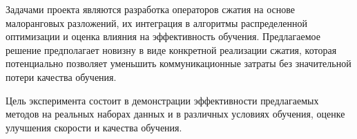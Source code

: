 \documentclass{article}
\begin{document}
Задачами проекта являются разработка операторов сжатия на основе малоранговых разложений, их интеграция в алгоритмы распределенной оптимизации и оценка влияния на эффективность обучения. Предлагаемое решение предполагает новизну в виде конкретной реализации сжатия, которая потенциально позволяет уменьшить коммуникационные затраты без значительной потери качества обучения.

Цель эксперимента состоит в демонстрации эффективности предлагаемых методов на реальных наборах данных и в различных условиях обучения, оценке улучшения скорости и качества обучения.



\end{document}
